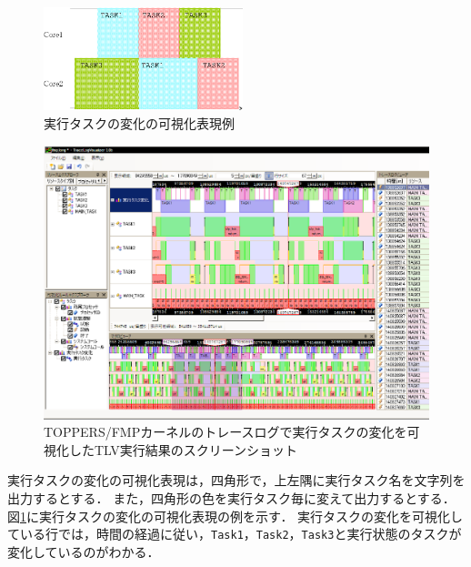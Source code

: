 \begin{figure}[t]
\begin{center}
\includegraphics[height=3cm]{img/runningTaskChangeVisual.eps}
\caption{実行タスクの変化の可視化表現例}
\label{fig:runningTaskChangeVisual}
\end{center}
\end{figure}

\begin{figure}[!h]
\begin{center}
\includegraphics[width=15cm]{img/fmpRunTaskTLVscreenShot.eps}
\caption{TOPPERS/FMPカーネルのトレースログで実行タスクの変化を可視化したTLV実行結果のスクリーンショット}
\label{fig:fmppTLVscreenShot}
\end{center}
\end{figure}

実行タスクの変化の可視化表現は，四角形で，上左隅に実行タスク名を文字列を出力するとする．
また，四角形の色を実行タスク毎に変えて出力するとする．
図\ref{fig:runningTaskChangeVisual}に実行タスクの変化の可視化表現の例を示す．
実行タスクの変化を可視化している行では，時間の経過に従い，{\tt Task1}，{\tt Task2}，{\tt Task3}と実行状態のタスクが変化しているのがわかる．
\fi
